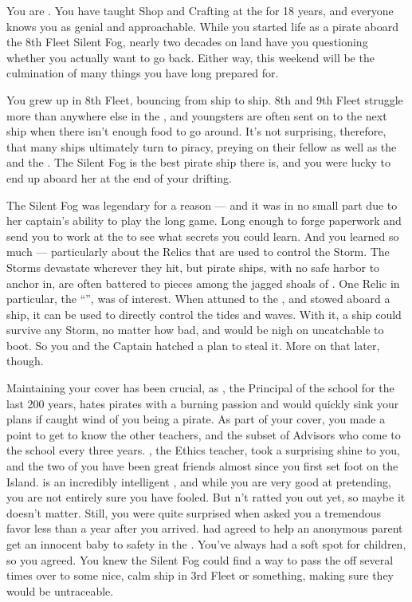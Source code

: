 \documentclass[char]{GL2020}
\begin{document}
\name{\cPirate{}}

You are \cPirate{\intro}. You have taught Shop and Crafting at the \pSchool{} for 18 years, and everyone knows you as genial and approachable. While you started life as a pirate aboard the 8th Fleet Silent Fog, nearly two decades on land have you questioning whether you actually want to go back. Either way, this weekend will be the culmination of many things you have long prepared for.

You grew up in 8th Fleet, bouncing from ship to ship. 8th and 9th Fleet struggle more than anywhere else in the \pShip{}, and youngsters are often sent on to the next ship when there isn't enough food to go around. It's not surprising, therefore, that many ships ultimately turn to piracy, preying on their fellow \pShippies{} as well as the \pFarm{} and the \pTech{}. The Silent Fog is the best pirate ship there is, and you were lucky to end up aboard her at the end of your drifting.

The Silent Fog was legendary for a reason — and it was in no small part due to her captain's ability to play the long game. Long enough to forge paperwork and send you to work at the \pSchool{} to see what secrets you could learn. And you learned so much — particularly about the Relics that are used to control the Storm. The Storms devastate wherever they hit, but pirate ships, with no safe harbor to anchor in, are often battered to pieces among the jagged shoals of \pWod{}. One Relic in particular, the ``\iNet{}'', was of interest. When attuned to the \pShip{}, and stowed aboard a ship, it can be used to directly control the tides and waves. With it, a ship could survive any Storm, no matter how bad, and would be nigh on uncatchable to boot. So you and the Captain hatched a plan to steal it. More on that later, though.

Maintaining your cover has been crucial, as \cPrincipal{\intro}, the Principal of the school for the last 200 years, hates pirates with a burning passion and would quickly sink your plans if \cPrincipal{\they} caught wind of you being a pirate. As part of your cover, you made a point to get to know the other teachers, and the subset of Advisors who come to the school every three years. \cEthics{\intro}, the Ethics teacher, took a surprising shine to you, and the two of you have been great friends almost since you first set foot on the Island. \cEthics{} is an incredibly intelligent \cEthics{\person}, and while you are very good at pretending, you are not entirely sure you have \cEthics{\them} fooled. But \cEthics{\theyhave}n't ratted you out yet, so maybe it doesn't matter. Still, you were quite surprised when \cEthics{\they} asked you a tremendous favor less than a year after you arrived. \cEthics{} had agreed to help an anonymous parent get an innocent baby to safety in the \pShip{}. You've always had a soft spot for children, so you agreed. You knew the Silent Fog could find a way to pass the \cPirateChild{\child} off several times over to some nice, calm ship in 3rd Fleet or something, making sure they would be untraceable.
\end{document}
